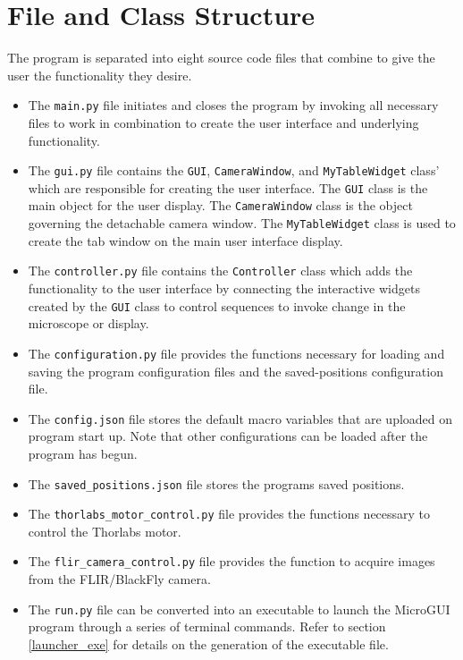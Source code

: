\documentclass[a4paper, 12pt]{report}
\begin{document}
    \section{File and Class Structure}
    The program is separated into eight source code files that combine to give the user the functionality they desire.
    \begin{itemize}
        \item The \verb|main.py| file initiates and closes the program by invoking all necessary files to work in combination to create the user interface and underlying functionality.
        \item The \verb|gui.py| file contains the \verb|GUI|, \verb|CameraWindow|, and \verb|MyTableWidget| class' which are responsible for creating the user interface. The \verb|GUI| class is the main object for the user display. The \verb|CameraWindow| class is the object governing the detachable camera window. The \verb|MyTableWidget| class is used to create the tab window on the main user interface display.
        \item The \verb|controller.py| file contains the \verb|Controller| class which adds the functionality to the user interface by connecting the interactive widgets created by the \verb|GUI| class to control sequences to invoke change in the microscope or display.
        \item The \verb|configuration.py| file provides the functions necessary for loading and saving the program configuration files and the saved-positions configuration file.
        \item The \verb|config.json| file stores the default macro variables that are uploaded on program start up. Note that other configurations can be loaded after the program has begun.
        \item The \verb|saved_positions.json| file stores the programs saved positions. 
        \item The \verb|thorlabs_motor_control.py| file provides the functions necessary to control the Thorlabs motor.
        \item The \verb|flir_camera_control.py| file provides the function to acquire images from the FLIR/BlackFly camera.
        \item The \verb|run.py| file can be converted into an executable to launch the MicroGUI program through a series of terminal commands. Refer to section \ref{launcher_exe} for details on the generation of the executable file.
    \end{itemize}
    
\end{document}
